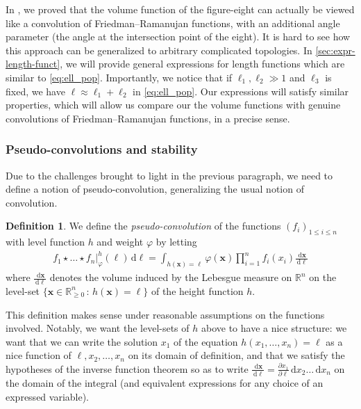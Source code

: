 \documentclass[12pt,twoside]{article}
\theoremstyle{theorem}
\theoremstyle{remark}
\theoremstyle{definition}
\newtheorem{defi}[thm]{Definition}
\theoremstyle{example}
\newcommand{\R}{\mathbb{R}}
\renewcommand{\d}{\, \mathrm{d}}
\newcommand{\x}{\mathbf{x}}
\newcommand{\1}[1]{\mathds{1}_{#1}}
\begin{document}
  In \cite{anantharaman2023}, we proved that the volume function of the figure-eight can actually be
  viewed like a convolution of Friedman--Ramanujan functions, with an additional angle parameter
  (the angle at the intersection point of the eight). It is hard to see how this approach can be
  generalized to arbitrary complicated topologies. In \cref{sec:expr-length-funct}, we will provide
  general expressions for length functions which are similar to \eqref{eq:ell_pop}.  Importantly, we
  notice that if $\ell_1, \ell_2 \gg 1$ and $\ell_3$ is fixed, we have $\ell \approx \ell_1+\ell_2$
  in \eqref{eq:ell_pop}. Our expressions will satisfy similar properties, which will allow us
  compare our the volume functions with genuine convolutions of Friedman--Ramanujan functions, in a
  precise sense.
  
\subsubsection{Pseudo-convolutions and stability}
\label{sec:pseudo-conv-stab}

Due to the challenges brought to light in the previous paragraph, we need to define a notion of
pseudo-convolution, generalizing the usual notion of convolution. 

\begin{defi}
  We define the \emph{pseudo-convolution} of the functions $(f_i)_{1 \leq i \leq n}$ with level
  function $h$ and weight $\varphi$  by letting
   \begin{align*}
   f_1\star \ldots \star f_n|^h_\varphi(\ell) \d \ell
     = \int_{h(\x)=\ell}
     \varphi(\x) \prod_{i=1}^n f_i(x_i) \frac{\d \x}{\d \ell}
   \end{align*}
   where $\frac{\d \x}{\d \ell}$ denotes the volume induced by the Lebesgue measure on $\R^n$ on the
   level-set $\{\x \in \R_{\geq 0}^n \, : \, h(\x)=\ell\}$ of the height function $h$.
 \end{defi}
 This definition makes sense under reasonable assumptions on the functions involved. Notably, we
 want the level-sets of $h$ above to have a nice structure: we want that we can write the solution
 $x_1$ of the equation $h(x_1, \ldots, x_n)=\ell$ as a nice function of $\ell, x_2, \ldots, x_n$ on
 its domain of definition, and that we satisfy the hypotheses of the inverse function theorem so as
 to write $\frac{\d \x}{\d \ell} = \frac{\partial x_1}{\partial \ell} \d x_2\ldots \d x_n$ on the
 domain of the integral (and equivalent expressions for any choice of an expressed variable).
\end{document}
